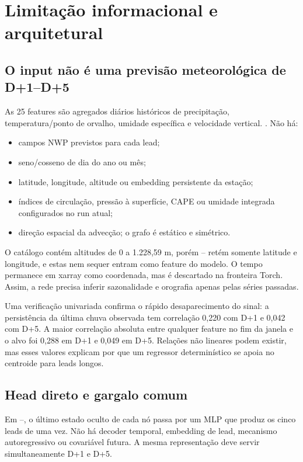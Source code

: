 \documentclass[11pt,a4paper]{article}
\newcommand{\code}[1]{\texttt{\detokenize{#1}}}
\begin{document}
\section{Limitação informacional e arquitetural}

\subsection{O input não é uma previsão meteorológica de D+1--D+5}

As 25 features são agregados diários históricos de precipitação, temperatura/ponto de orvalho,
umidade específica e velocidade vertical. \code{INCLUDE_WIND=False}. Não há:

\begin{itemize}
  \item campos NWP previstos para cada lead;
  \item seno/cosseno de dia do ano ou mês;
  \item latitude, longitude, altitude ou embedding persistente da estação;
  \item índices de circulação, pressão à superfície, CAPE ou umidade integrada configurados no
  run atual;
  \item direção espacial da advecção; o grafo é estático e simétrico.
\end{itemize}

O catálogo contém altitudes de 0 a 1.228,59 m, porém
-- retém somente
latitude e longitude, e estas nem sequer entram como feature do modelo. O tempo permanece em
xarray como coordenada, mas é descartado na fronteira Torch. Assim, a rede precisa inferir
sazonalidade e orografia apenas pelas séries passadas.

Uma verificação univariada confirma o rápido desaparecimento do sinal: a persistência da última
chuva observada tem correlação 0,220 com D+1 e 0,042 com D+5. A maior correlação absoluta entre
qualquer feature no fim da janela e o alvo foi 0,288 em D+1 e 0,049 em D+5. Relações não
lineares podem existir, mas esses valores explicam por que um regressor determinístico se apoia
no centroide para leads longos.

\subsection{Head direto e gargalo comum}

Em --, o último estado oculto de
cada nó passa por um MLP que produz os cinco leads de uma vez. Não há decoder temporal,
embedding de lead, mecanismo autoregressivo ou covariável futura. A mesma representação deve
servir simultaneamente D+1 e D+5.
\end{document}
